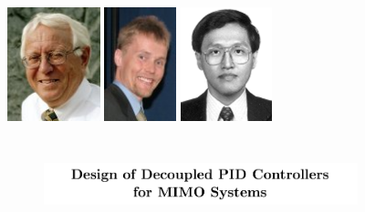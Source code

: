 \documentclass[
  letterpaper,
  DIV=11,
  numbers=noendperiod,
  oneside]{scrartcl}
\begin{document}
\begin{figure}

\begin{minipage}{0.33\linewidth}
\includegraphics[width=\textwidth,height=1.30208in]{figs/astrom.png}\end{minipage}%
%
\begin{minipage}{0.33\linewidth}
\includegraphics[width=\textwidth,height=1.30208in]{figs/johansson.png}\end{minipage}%
%
\begin{minipage}{0.33\linewidth}
\includegraphics[width=\textwidth,height=1.30208in]{figs/wang.png}\end{minipage}%
\newline
\begin{minipage}{\linewidth}

\begin{figure}[H]

{\centering \includegraphics[width=\textwidth,height=1.04167in]{figs/decoupled_screenshot.png}

}


\end{figure}%

\end{minipage}%

\end{figure}%
\end{document}
